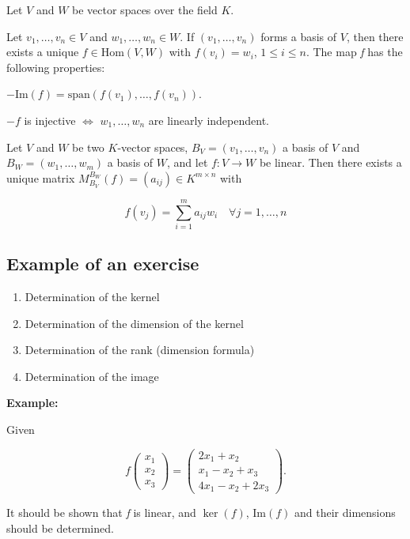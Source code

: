 Let \(V\) and \(W\) be vector spaces over the field \(K\).
\vspace{\baselineskip}

Let \(v_1, \dots, v_n \in V\) and \(w_1, \dots, w_n \in W\). If \((v_1, \dots, v_n)\) 
forms a basis of \(V\), then there exists a unique \(f \in \text{Hom}(V, W)\) with 
\(f(v_i) = w_i\), \(1 \leq i \leq n\). The map \emph{f} has the following properties:

\(- \text{Im}(f) = \text{span}(f(v_1), \dots, f(v_n))\).

\(- f\) is injective \(\Leftrightarrow\) \(w_1, \dots, w_n\) are linearly independent.

Let \(V\) and \(W\) be two \(K\)-vector spaces, \(B_V = (v_1, \dots, v_n)\) a basis of \(V\) and \(B_W = (w_1, \dots, w_m)\) a basis of \(W\), and let \(f : V \rightarrow W\) be linear. Then there exists a unique matrix \(M_{B_V}^{B_W}(f) = (a_{ij}) \in K^{m \times n}\) with

\[
    f(v_j) = \sum_{i=1}^{m} a_{ij}w_i \quad \forall j = 1, \dots, n
\]

\subsection{Example of an exercise}

\begin{enumerate}
    \item Determination of the kernel
    \item Determination of the dimension of the kernel
    \item Determination of the rank (dimension formula)
    \item Determination of the image
\end{enumerate}


\textbf{Example:}
\vspace{\baselineskip}
 
Given

\[
    f\begin{pmatrix}
    x_1 \\
    x_2 \\
    x_3
    \end{pmatrix} =
    \begin{pmatrix}
    2x_1 + x_2 \\
    x_1 - x_2 + x_3 \\
    4x_1 - x_2 + 2x_3
    \end{pmatrix} .
\]

It should be shown that \emph{f} is linear, and \(\ker(f)\), \(\text{Im}(f)\) and their dimensions should be determined.

